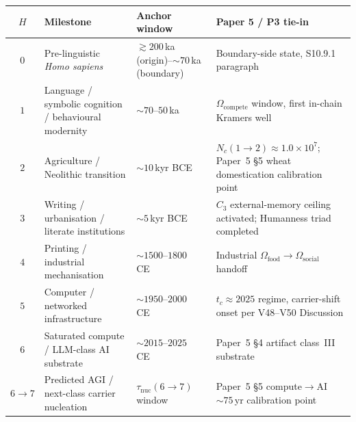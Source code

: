 \documentclass[11pt]{article}
\begin{document}
\begin{center}
\begin{tabular}{@{}clll@{}}
\toprule
$H$ & Milestone & Anchor window & Paper 5 / P3 tie-in \\
\midrule
$0$    & Pre-linguistic \emph{Homo sapiens} & $\gtrsim 200$\,ka (origin)--$\sim 70$\,ka (boundary)~\cite{ambrose1998} & Boundary-side state, S10.9.1 paragraph \\
$1$    & Language / symbolic cognition / behavioural modernity & $\sim 70$--$50$\,ka~\cite{ambrose1998} & $\Omega_{\mathrm{compete}}$ window, first in-chain Kramers well \\
$2$    & Agriculture / Neolithic transition & $\sim 10$\,kyr BCE~\cite{diamond1997} & $N_c(1{\to}2)\approx 1.0{\times}10^{7}$; Paper~5 \S5 wheat domestication calibration point \\
$3$    & Writing / urbanisation / literate institutions & $\sim 5$\,kyr BCE~\cite{schmandtbesserat1992} & $C_3$ external-memory ceiling activated; Humanness triad completed \\
$4$    & Printing / industrial mechanisation & $\sim 1500$--$1800$\,CE~\cite{mokyr2002} & Industrial $\Omega_{\mathrm{food}}\to\Omega_{\mathrm{social}}$ handoff \\
$5$    & Computer / networked infrastructure & $\sim 1950$--$2000$\,CE~\cite{ceruzzi2012} & $t_c\approx 2025$ regime, carrier-shift onset per V48--V50 Discussion \\
$6$    & Saturated compute / LLM-class AI substrate & $\sim 2015$--$2025$\,CE~\cite{sevilla2022,hernandez2021} & Paper~5 \S4 artifact class~III substrate \\
$6{\to}7$ & Predicted AGI / next-class carrier nucleation & $\tau_{\mathrm{nuc}}(6{\to}7)$ window~\cite{Kato2026e} & Paper~5 \S5 compute$\to$AI $\sim 75$\,yr calibration point \\
\bottomrule
\end{tabular}
\end{center}
\end{document}
